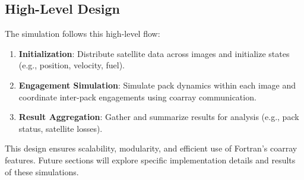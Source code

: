 \subsection{High-Level Design}

The simulation follows this high-level flow:
\begin{enumerate}
    \item \textbf{Initialization}:
        Distribute satellite data across images and initialize states (e.g., position, velocity, fuel).
    \item \textbf{Engagement Simulation}:
        Simulate pack dynamics within each image and coordinate inter-pack engagements using coarray communication.
    \item \textbf{Result Aggregation}:
        Gather and summarize results for analysis (e.g., pack status, satellite losses).
\end{enumerate}

This design ensures scalability, modularity, and efficient use of Fortran’s coarray features. Future sections will explore specific implementation details and results of these simulations.
